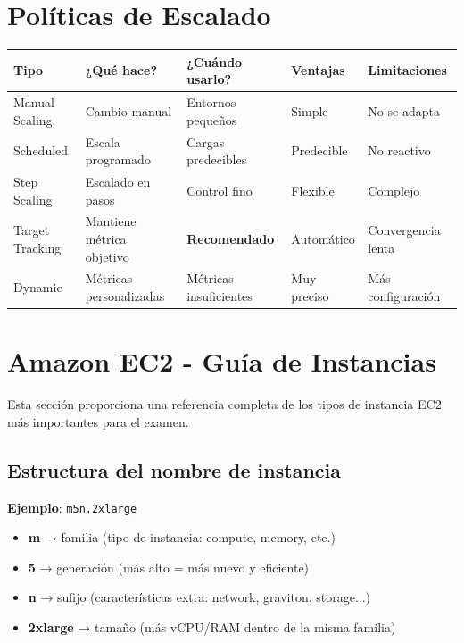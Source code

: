 \documentclass[12pt,a4paper]{report}
\newcommand{\important}[1]{\textcolor{dangerred}{\textbf{#1}}}
\begin{document}
\section{Políticas de Escalado}

\begin{center}
\begin{longtable}{|p{3cm}|p{3cm}|p{3cm}|p{2cm}|p{2cm}|}
\hline
\cellcolor{awsblue!20}\textbf{Tipo} & \cellcolor{awsblue!20}\textbf{¿Qué hace?} & \cellcolor{awsblue!20}\textbf{¿Cuándo usarlo?} & \cellcolor{awsblue!20}\textbf{Ventajas} & \cellcolor{awsblue!20}\textbf{Limitaciones} \\
\hline
Manual Scaling & Cambio manual & Entornos pequeños & Simple & No se adapta \\
\hline
Scheduled & Escala programado & Cargas predecibles & Predecible & No reactivo \\
\hline
Step Scaling & Escalado en pasos & Control fino & Flexible & Complejo \\
\hline
\cellcolor{successgreen!20}Target Tracking & Mantiene métrica objetivo & \important{Recomendado} & Automático & Convergencia lenta \\
\hline
Dynamic & Métricas personalizadas & Métricas insuficientes & Muy preciso & Más configuración \\
\hline
\end{longtable}
\end{center}

\section{Amazon EC2 - Guía de Instancias}

\begin{conceptbox}
Esta sección proporciona una referencia completa de los tipos de instancia EC2 más importantes para el examen.
\end{conceptbox}

\subsection{Estructura del nombre de instancia}

\textbf{Ejemplo}: \texttt{m5n.2xlarge}

\begin{itemize}
    \item \textbf{m} → familia (tipo de instancia: compute, memory, etc.)
    \item \textbf{5} → generación (más alto = más nuevo y eficiente)
    \item \textbf{n} → sufijo (características extra: network, graviton, storage...)
    \item \textbf{2xlarge} → tamaño (más vCPU/RAM dentro de la misma familia)
\end{itemize}
\end{document}
